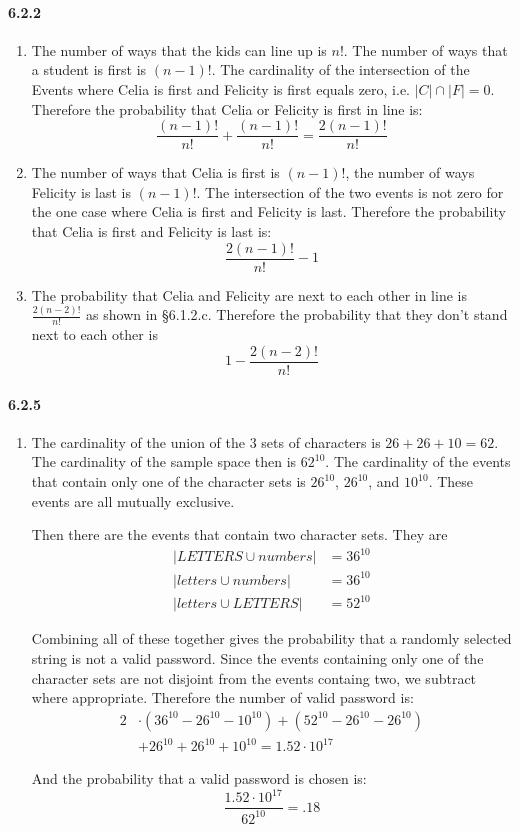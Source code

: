 \documentclass[11pt, letterpaper, twocolumn, fleqn]{article}
\begin{document}
\paragraph{6.2.2}
\begin{enumerate}
  \item The number of ways that the kids can line up is $n!$. The number of ways that a student is first is $(n-1)!$. The cardinality of the intersection of the Events where Celia is first and Felicity is first equals zero, i.e. $|C| \cap |F| = 0$. Therefore the probability that Celia or Felicity is first in line is:
    $$\frac{(n-1)!}{n!} + \frac{(n-1)!}{n!} = \frac{2(n-1)!}{n!}$$
    
  \item The number of ways that Celia is first is $(n-1)!$, the number of ways Felicity is last is $(n-1)!$. The intersection of the two events is not zero for the one case where Celia is first and Felicity is last. Therefore the probability that Celia is first and Felicity is last is:
    $$\frac{2(n-1)!}{n!} - 1$$
    
  \item The probability that Celia and Felicity are next to each other in line is $\frac{2(n-2)!}{n!}$ as shown in \S 6.1.2.c. Therefore the probability that they don't stand next to each other is 
    $$1 - \frac{2(n-2)!}{n!}$$
\end{enumerate}

\paragraph{6.2.5}
\begin{enumerate}
  \item The cardinality of the union of the 3 sets of characters is $26+26+10 = 62$. The cardinality of the sample space then is $62^{10}$. The cardinality of the events that contain only one of the character sets is $26^{10}$, $26^{10}$, and $10^{10}$. These events are all mutually exclusive.
  
  Then there are the events that contain two character sets. They are
  \begin{align*}
    |LETTERS \cup numbers| &= 36^{10}\\
    |letters \cup numbers| &= 36^{10}\\
    |letters \cup LETTERS| &= 52^{10} 
  \end{align*}
  
  Combining all of these together gives the probability that a randomly selected string is not a valid password. Since the events containing only one of the character sets are not disjoint from the events containg two, we subtract where appropriate. Therefore the number of valid password is:
  \begin{align*}
    2&\cdot(36^{10} - 26^{10} - 10^{10}) + (52^{10} - 26^{10} - 26^{10}) \\
    &+26^{10} + 26^{10} + 10^{10} = 1.52\cdot10^{17}
  \end{align*}
  
  And the probability that a valid password is chosen is:
    $$\frac{1.52\cdot10^{17}}{62^{10}} = .18$$
\end{enumerate}
\end{document}
